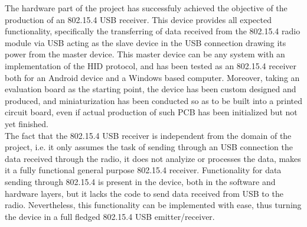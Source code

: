 		The hardware part of the project has successfuly achieved the objective of the production of an 802.15.4 USB receiver. This device provides all expected functionality, specifically the transferring of data received from the 802.15.4 radio module via USB acting as the slave device in the USB connection drawing its power from the master device. This master device can be any system with an implementation of the HID protocol, and has been tested as an 802.15.4 receiver both for an Android device and a Windows based computer. Moreover, taking an evaluation board as the starting point, the device has been custom designed and produced, and miniaturization has been conducted so as to be built into a printed circuit board, even if actual production of such PCB has been initialized but not yet finished.\\

		The fact that the 802.15.4 USB receiver is independent from the domain of the project, i.e. it only assumes the task of sending through an USB connection the data received through the radio, it does not analyize or processes the data, makes it a fully functional general purpose 802.15.4 receiver. Functionality for data sending through 802.15.4 is present in the device, both in the software and hardware layers, but it lacks the code to send data received from USB to the radio. Nevertheless, this functionality can be implemented with ease, thus turning the device in a full fledged 802.15.4 USB emitter/receiver.\\

